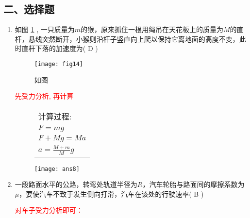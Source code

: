 \subsection*{二、选择题}
\begin{enumerate}
    \item  如图 \ref{Fig:14} , 一只质量为$m$的猴，原来抓住一根用绳吊在天花板上的质量为$M$的直杆，悬线突然断开，小猴则沿杆子竖直向上爬以保持它离地面的高度不变，此时直杆下落的加速度为( D )
    \begin{figure}[H]
        \centering
        \texttt{[image: fig14]}
            \caption{如图}\label{Fig:14}
    \end{figure}

    \begin{note}
        \textcolor{red}{先受力分析, 再计算}
        \begin{figure}[H]
            \begin{minipage}[ht]{0.6\linewidth}
                \begin{table}[H]
                    \begin{tabular}{l}
                       \qquad 计算过程:\\
                       \qquad \qquad $F=mg$ \\
                        \qquad \qquad   $F+Mg = Ma$ \\
                        \qquad \qquad $a = \frac{M+m}{M}g$\\ 
                    \end{tabular}
                \end{table}  
            \end{minipage}
            \begin{minipage}[H]{0.3\linewidth}
                \texttt{[image: ans8]}
            \end{minipage}
        \end{figure}
    \end{note}
    \item 一段路面水平的公路，转弯处轨道半径为$R$，汽车轮胎与路面间的摩擦系数为$\mu$，要使汽车不致于发生侧向打滑，汽车在该处的行驶速率( B )
    \begin{note}
        \textcolor{red}{对车子受力分析即可：}
        \begin{figure}[H]

\end{figure}
\end{note}
\end{enumerate}
